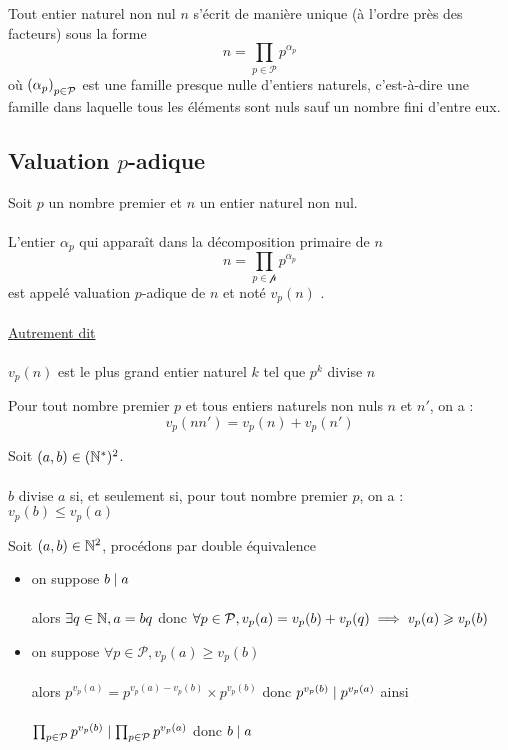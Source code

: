 \begin{defprop}[Corrolaire]
    Tout entier naturel non nul \(n\) s’écrit de manière unique (à l’ordre près des facteurs) sous la forme
    \[n = \prod_{p \in \mathcal{P}}p^{\alpha_p}\]
    où \(\left(\alpha_p\right)_{p \in \mathcal{P}}\) est une famille presque nulle d’entiers naturels, c’est-à-dire une famille dans laquelle tous les éléments sont nuls sauf un nombre fini d’entre eux.
\end{defprop}

\subsection{Valuation \(p\)-adique}
\begin{defprop}
    Soit \(p\) un nombre premier et \(n\) un entier naturel non nul.\\~\\
    L’entier \(\alpha_p\) qui apparaît dans la décomposition primaire de \(n\)
    \[n = \prod_{p \in \mathcal{p}} p ^{\alpha_p}\]
    est appelé valuation \(p\)-adique de \(n\) et noté \(v_p(n)\) .\\~\\
    \underline{Autrement dit}\\~\\
    \(v_p(n)\) est le plus grand entier naturel \(k\) tel que \(p^k\) divise \(n\)
\end{defprop}

\begin{defprop}
    Pour tout nombre premier \(p\) et tous entiers naturels non nuls \(n\) et \(n'\), on a :
    \[v_p(nn') = v_p(n) + v_p(n')\]
\end{defprop}

\begin{defprop}
    Soit \((a, b) \in (\mathbb{N}^*)^2\).\\~\\
    \(b\) divise \(a\) si, et seulement si, pour tout nombre premier \(p\), on a : \(v_p(b) \leq v_p(a)\)
\end{defprop}

\begin{dem}
    Soit \((a,b) \in \mathbb{N}^2\), procédons par double équivalence
    \begin{itemize}
        \item \impdir on suppose \(b\mid a\)\\~\\
        alors \(\exists q \in \mathbb{N}, a = bq\) donc \(\forall p \in \mathcal{P}, v_p(a) = v_p(b) + v_p(q) \implies v_p(a) \geqslant v_p(b)\)
        \item \imprec on suppose \(\forall p \in \mathcal{P}, v_p(a) \geq v_p(b)\)\\~\\
        alors \(p^{v_p(a)} = p^{v_p(a) - v_p(b)} \times p^{v_p(b)}\) donc \(p^{v_p(b)} \mid p^{v_p(a)}\) ainsi\\~\\
        \(\prod_{p \in \mathcal{P}}p^{v_p(b)} \mid \prod_{p \in \mathcal{P}}p^{v_p(a)}\) donc \(b \mid a\)
    \end{itemize}
\end{dem}


